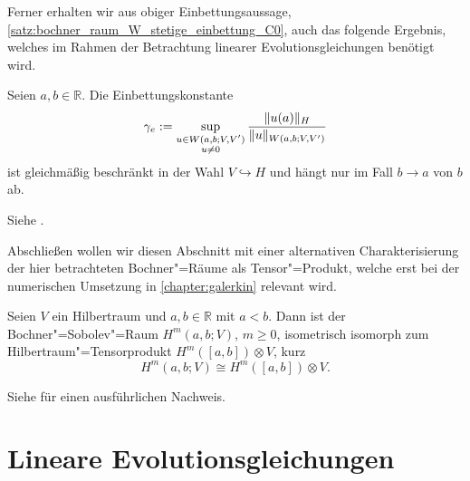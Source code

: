 \documentclass[../main.tex]{subfiles}
\begin{document}
Ferner erhalten wir aus obiger Einbettungsaussage, \cref{satz:bochner_raum_W_stetige_einbettung_C0}, auch das folgende Ergebnis, welches im Rahmen der Betrachtung linearer Evolutionsgleichungen benötigt wird.

\begin{Korollar}
\label{korollar:einbettungskonstante_M_e}
    Seien $a, b \in \mathbb{R}$.
    Die Einbettungskonstante
    \begin{equation}
        \label{eq:einbettungskonstante_M_e}
        \gamma_{e} := \sup_{\substack{u\in W(a, b; V, V')\\u \neq 0}} \frac{\lVert u(a)\rVert_{H}}{\lVert u\rVert_{W(a, b; V, V')}}
    \end{equation}
    ist gleichmäßig beschränkt in der Wahl $V \hookrightarrow H$ und hängt nur im Fall $b \to a$ von $b$ ab.

    \begin{Beweis}
        Siehe \cites[Section 5]{Schwab:2009ec}[Beweis zu Theorem XVIII.2.1]{Dautray:1992by}.
    \end{Beweis}
\end{Korollar}
%

Abschließen wollen wir diesen Abschnitt mit einer alternativen Charakterisierung der hier betrachteten Bochner"=Räume als Tensor"=Produkt, welche erst bei der numerischen Umsetzung in \cref{chapter:galerkin} relevant wird.

\begin{Satz}
\label{satz:bochner_sobolev_raum_als_tensorprodukt}
    Seien $V$ ein Hilbertraum und $a, b \in \mathbb{R}$ mit $a < b$.
    Dann ist der Bochner"=Sobolev"=Raum $H^{m}(a, b; V)$, $m \geq 0$, isometrisch isomorph zum Hilbertraum"=Tensorprodukt $H^{m}([a, b]) \otimes V$, kurz
    \begin{equation}
        H^{m}(a, b; V) \cong H^{m}([a, b]) \otimes V.
    \end{equation}

    \begin{Beweis}
        Siehe \cite[Theorem 12.6.1, Theorem 12.7.1]{Aubin:2000un} für einen ausführlichen Nachweis.
    \end{Beweis}
\end{Satz}


\section{Lineare Evolutionsgleichungen} %
\label{section:lineare_evolutionsgleichungen}
\end{document}
